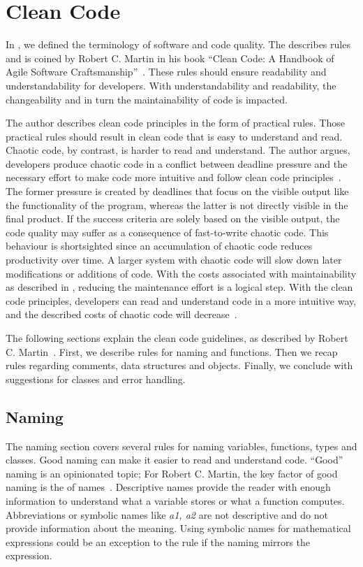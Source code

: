 \section{Clean Code}\label{sec:clean_code}
In , we defined the terminology of software and code quality. The  describes rules and is coined by Robert C. Martin in his book \enquote{Clean Code: A Handbook of Agile Software Craftsmanship}~\cite{martin_clean_2009}. These rules should ensure readability and understandability for developers. With understandability and readability, the changeability and in turn the maintainability of code is impacted.   

The author describes clean code principles in the form of practical rules. Those practical rules should result in clean code that is easy to understand and read. Chaotic code, by contrast, is harder to read and understand. The author argues, developers produce chaotic code in a conflict between deadline pressure and the necessary effort to make code more intuitive and follow clean code principles~\cite{martin_clean_2009}. The former pressure is created by deadlines that focus on the visible output like the functionality of the program, whereas the latter is not directly visible in the final product. If the success criteria are solely based on the visible output, the code quality may suffer as a consequence of fast-to-write chaotic code. This behaviour is shortsighted since an accumulation of chaotic code reduces productivity over time. A larger system with chaotic code will slow down later modifications or additions of code. With the costs associated with maintainability as described in , reducing the maintenance effort is a logical step. With the clean code principles, developers can read and understand code in a more intuitive way, and the described costs of chaotic code will decrease~\cite{martin_clean_2009}.

The following sections explain the clean code guidelines, as described by Robert C. Martin~\cite{martin_clean_2009}. First, we describe rules for naming and functions. Then we recap rules regarding comments, data structures and objects. Finally, we conclude with suggestions for classes and error handling.

\subsection{Naming}\label{sec:naming}
The naming section covers several rules for naming variables, functions, types and classes.
Good naming can make it easier to read and understand code. \enquote{Good} naming is an opinionated topic; For Robert C. Martin, the key factor of good naming is the  of names~\cite{martin_clean_2009}. Descriptive names provide the reader with enough information to understand what a variable stores or what a function computes. Abbreviations or symbolic names like \textit{a1, a2} are not descriptive and do not provide information about the meaning. Using symbolic names for mathematical expressions could be an exception to the rule if the naming mirrors the expression.

